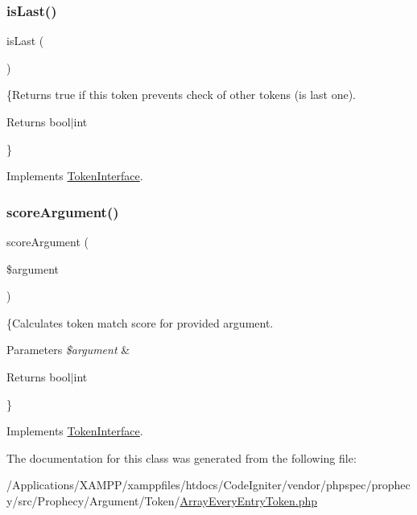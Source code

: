 \subsubsection{\texorpdfstring{is\+Last()}{isLast()}}
{\footnotesize\ttfamily is\+Last (\begin{DoxyParamCaption}{ }\end{DoxyParamCaption})}

\{Returns true if this token prevents check of other tokens (is last one).

\begin{DoxyReturn}{Returns}
bool$\vert$int
\end{DoxyReturn}
\} 

Implements \mbox{\hyperlink{interface_prophecy_1_1_argument_1_1_token_1_1_token_interface_ac72b8349b1340887fc1af30eca2b951c}{Token\+Interface}}.

\mbox{\label{class_prophecy_1_1_argument_1_1_token_1_1_array_every_entry_token_a8d5bf47ab6eaa935458d5ad160e52822}} 
\subsubsection{\texorpdfstring{score\+Argument()}{scoreArgument()}}
{\footnotesize\ttfamily score\+Argument (\begin{DoxyParamCaption}\item[{}]{\$argument }\end{DoxyParamCaption})}

\{Calculates token match score for provided argument.


\begin{DoxyParams}{Parameters}
{\em \$argument} & \\
\hline
\end{DoxyParams}
\begin{DoxyReturn}{Returns}
bool$\vert$int
\end{DoxyReturn}
\} 

Implements \mbox{\hyperlink{interface_prophecy_1_1_argument_1_1_token_1_1_token_interface_a8d5bf47ab6eaa935458d5ad160e52822}{Token\+Interface}}.



The documentation for this class was generated from the following file\+:\begin{DoxyCompactItemize}
\item 
/\+Applications/\+X\+A\+M\+P\+P/xamppfiles/htdocs/\+Code\+Igniter/vendor/phpspec/prophecy/src/\+Prophecy/\+Argument/\+Token/\mbox{\hyperlink{_array_every_entry_token_8php}{Array\+Every\+Entry\+Token.\+php}}\end{DoxyCompactItemize}
